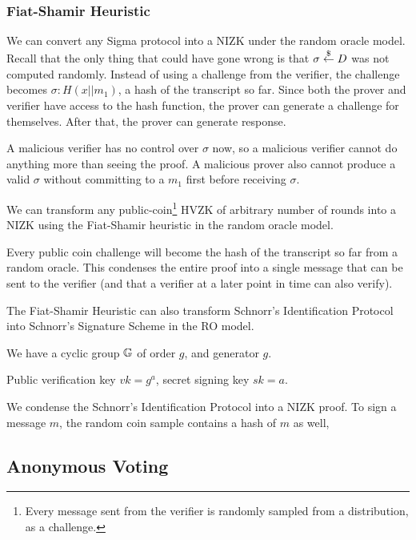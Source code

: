 \subsubsection{Fiat-Shamir Heuristic}
We can convert any Sigma protocol into a NIZK under the random oracle model. Recall that the only thing that could have gone wrong is that $\sigma\overset{\$}{\leftarrow} D$ was not computed randomly. Instead of using a challenge from the verifier, the challenge becomes $\sigma: H(x||m_1)$, a hash of the transcript so far. Since both the prover and verifier have access to the hash function, the prover can generate a challenge for themselves. After that, the prover can generate response.

A malicious verifier has no control over $\sigma$ now, so a malicious verifier cannot do anything more than seeing the proof. A malicious prover also cannot produce a valid $\sigma$ without committing to a $m_1$ first before receiving $\sigma$.

We can transform any public-coin\footnote{Every message sent from the verifier is randomly sampled from a distribution, as a challenge.} HVZK of arbitrary number of rounds into a NIZK using the Fiat-Shamir heuristic in the random oracle model.

Every public coin challenge will become the hash of the transcript so far from a random oracle. This condenses the entire proof into a single message that can be sent to the verifier (and that a verifier at a later point in time can also verify).

\begin{example}
    The Fiat-Shamir Heuristic can also transform Schnorr's Identification Protocol into Schnorr's Signature Scheme in the RO model.

    We have a cyclic group $\mathbb G$ of order $g$, and generator $g$.

    Public verification key $vk = g^a$, secret signing key $sk = a$.

    We condense the Schnorr's Identification Protocol into a NIZK proof. To sign a message $m$, the random coin sample contains a hash of $m$ as well, 
\end{example}

\subsection{Anonymous Voting}
